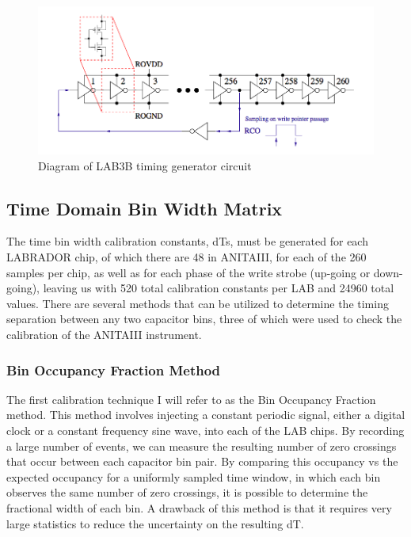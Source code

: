 \noindent		
\begin{figure}
	\includegraphics[width=\textwidth]{figures/LAB3BTimingGenerator}
	\caption{Diagram of LAB3B timing generator circuit\cite{LABASICPAPER} }
	\label{fig:timingGenerator}
\end{figure}

	\subsection{Time Domain Bin Width Matrix}
		The time bin width calibration constants, dTs, must be generated for each LABRADOR chip, of which there are 48 in ANITAIII, for each of the 260 samples per chip, as well as for each phase of the write strobe (up-going or down-going), leaving us with 520 total calibration constants per LAB and 24960 total values. There are several methods that can be utilized to determine the timing separation between any two capacitor bins, three of which were used to check the calibration of the ANITAIII instrument.
		
	\subsubsection{Bin Occupancy Fraction Method}
		
		The first calibration technique I will refer to as the Bin Occupancy Fraction method.  This method involves injecting a constant periodic signal, either a digital clock or a constant frequency sine wave, into each of the LAB chips.  By recording a large number of events, we can measure the resulting number of zero crossings that occur between each capacitor bin pair.  By comparing this occupancy vs the expected occupancy for a uniformly sampled time window, in which each bin observes the same number of zero crossings, it is possible to determine the fractional width of each bin.  A drawback of this method is that it requires very large statistics to reduce the uncertainty on the resulting dT.  
		
